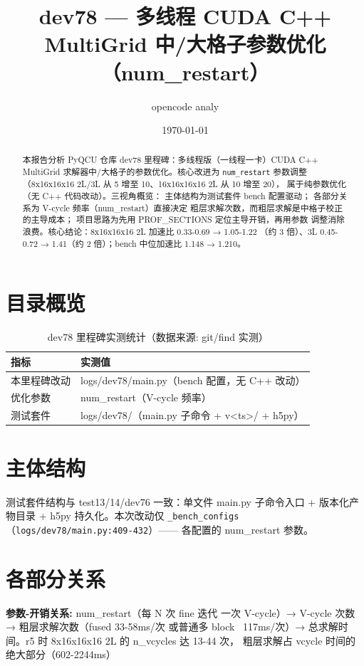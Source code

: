\documentclass[UTF8]{ctexart}
\title{dev78 --- 多线程 CUDA C++ MultiGrid 中/大格子参数优化（num\_restart）}
\author{opencode analy}
\date{\today}
\begin{document}
\maketitle

\begin{abstract}
本报告分析 PyQCU 仓库 dev78 里程碑：多线程版（一线程一卡）CUDA C++ MultiGrid
求解器中/大格子的参数优化。核心改进为 \texttt{num\_restart} 参数调整
（8x16x16x16 2L/3L 从 5 增至 10、16x16x16x16 2L 从 10 增至 20），
属于纯参数优化（无 C++ 代码改动）。三视角概览：
\textcolor{struct}{主体结构}为测试套件 bench 配置驱动；
\textcolor{relation}{各部分关系}为 V-cycle 频率（num\_restart）直接决定
粗层求解次数，而粗层求解是中格子校正的主导成本；
\textcolor{idea}{项目思路}为先用 PROF\_SECTIONS 定位主导开销，再用参数
调整消除浪费。核心结论：8x16x16x16 2L 加速比 0.33-0.69 → 1.05-1.22
（约 3 倍）、3L 0.45-0.72 → 1.41（约 2 倍）；bench 中位加速比
1.148 → 1.210。
\end{abstract}

\tableofcontents

\section{目录概览}
\begin{table}[htbp]\centering
\begin{tabular}{ll}
\toprule
指标 & 实测值 \\
\midrule
本里程碑改动 & logs/dev78/main.py（bench 配置，无 C++ 改动） \\
优化参数 & num\_restart（V-cycle 频率） \\
测试套件 & logs/dev78/（main.py 子命令 + v<ts>/ + h5py） \\
\bottomrule
\end{tabular}
\caption{dev78 里程碑实测统计（数据来源: git/find 实测）}
\end{table}

\section{主体结构}
测试套件结构与 test13/14/dev76 一致：单文件 main.py 子命令入口 +
版本化产物目录 + h5py 持久化。\textcolor{struct}{本次改动}仅
\texttt{\_bench\_configs}（\texttt{logs/dev78/main.py:409-432}）——
各配置的 num\_restart 参数。

\section{各部分关系}
\begin{keybox}
\textbf{参数-开销关系:} \textcolor{relation}{num\_restart（每 N 次 fine 迭代
一次 V-cycle）→ V-cycle 次数 → 粗层求解次数（fused 33-58ms/次 或普通多 block
~117ms/次）→ 总求解时间。r5 时 8x16x16x16 2L 的 n\_vcycles 达 13-44 次，
粗层求解占 vcycle 时间的绝大部分（602-2244ms）}
\end{keybox}
\end{document}
